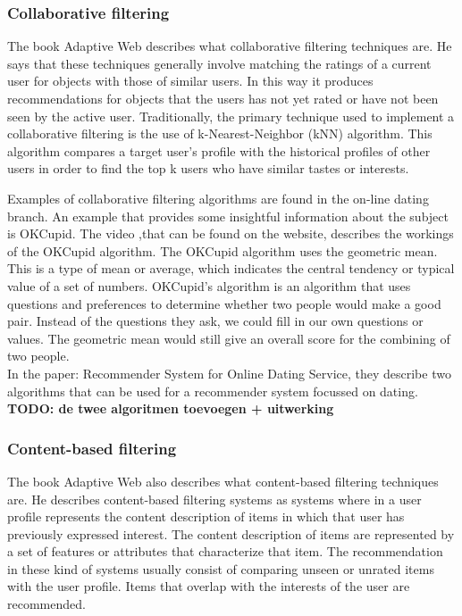 \documentclass[]{article}
\newcommand{\TODO}[1]{{\color{red}\textbf{TODO: #1}}}
\begin{document}
\subsubsection{Collaborative filtering}
The book Adaptive Web \citep{Peter2007} describes what collaborative filtering techniques are.
He says that these techniques generally involve matching the ratings of a current user for objects with those of similar users.
In this way it produces recommendations for objects that the users has not yet rated or have not been seen by the active user.
Traditionally, the primary technique used to implement a collaborative filtering is the use of k-Nearest-Neighbor (kNN) algorithm.
This algorithm compares a target user's profile with the historical profiles of other users in order to find the top k users who have similar tastes or interests.

Examples of collaborative filtering algorithms are found in the on-line dating branch.
An example that provides some insightful information about the subject is OKCupid.
The video ,that can be found on the website\cite{okcupid}, describes the workings of the OKCupid algorithm.
The OKCupid algorithm uses the geometric mean.
This is a type of mean or average, which indicates the central tendency or typical value of a set of numbers.
OKCupid's algorithm is an algorithm that uses questions and preferences to determine whether two people would make a good pair.
Instead of the questions they ask, we could fill in our own questions or values.
The geometric mean would still give an overall score for the combining of two people.\\

In the paper: Recommender System for Online Dating Service\cite{lukas07}, they describe two algorithms that can be used for a recommender system focussed on dating.
\TODO{de twee algoritmen toevoegen + uitwerking}


\subsubsection{Content-based filtering}
The book Adaptive Web \citep{Peter2007} also describes what content-based filtering techniques are.
He describes content-based filtering systems as systems where in a user profile represents the content description of items in which that user has previously expressed interest.
The content description of items are represented by a set of features or attributes that characterize that item.
The recommendation in these kind of systems usually consist of comparing unseen or unrated items with the user profile.
Items that overlap with the interests of the user are recommended.
\end{document}
